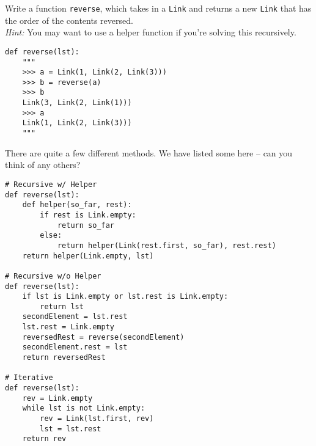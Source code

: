 \begin{blocksection}
\question Write a function \texttt{reverse}, which takes in a \texttt{Link} and
returns a new \texttt{Link} that has the order of the contents reversed.\\
\emph{Hint:} You may want to use a helper function if you're solving this
recursively.
\begin{lstlisting}
def reverse(lst):
    """
    >>> a = Link(1, Link(2, Link(3)))
    >>> b = reverse(a)
    >>> b
    Link(3, Link(2, Link(1)))
    >>> a
    Link(1, Link(2, Link(3)))
    """
\end{lstlisting}

\begin{solution}[1in]
There are quite a few different methods. We have listed some here -- can you
think of any others?
\begin{lstlisting}
# Recursive w/ Helper
def reverse(lst):
    def helper(so_far, rest):
        if rest is Link.empty:
            return so_far
        else:
            return helper(Link(rest.first, so_far), rest.rest)
    return helper(Link.empty, lst)

# Recursive w/o Helper
def reverse(lst):
    if lst is Link.empty or lst.rest is Link.empty:
        return lst
    secondElement = lst.rest
    lst.rest = Link.empty
    reversedRest = reverse(secondElement)
    secondElement.rest = lst
    return reversedRest

# Iterative
def reverse(lst):
    rev = Link.empty
    while lst is not Link.empty:
        rev = Link(lst.first, rev)
        lst = lst.rest
    return rev
\end{lstlisting}
\end{solution}

\end{blocksection}

